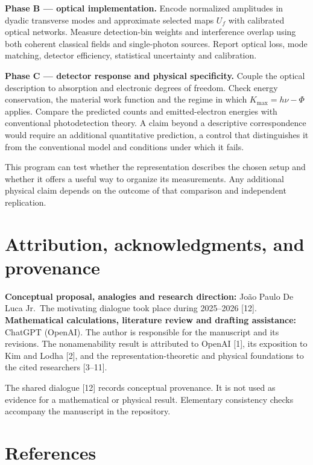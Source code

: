 \documentclass[11pt,a4paper]{article}
\begin{document}
\textbf{Phase B --- optical implementation.} Encode normalized amplitudes in dyadic transverse modes and approximate selected maps \(U_f\) with calibrated optical networks. Measure detection-bin weights and interference overlap using both coherent classical fields and single-photon sources. Report optical loss, mode matching, detector efficiency, statistical uncertainty and calibration.

\textbf{Phase C --- detector response and physical specificity.} Couple the optical description to absorption and electronic degrees of freedom. Check energy conservation, the material work function and the regime in which \(K_{\max}=h\nu-\Phi\) applies. Compare the predicted counts and emitted-electron energies with conventional photodetection theory. A claim beyond a descriptive correspondence would require an additional quantitative prediction, a control that distinguishes it from the conventional model and conditions under which it fails.

This program can test whether the representation describes the chosen setup and whether it offers a useful way to organize its measurements. Any additional physical claim depends on the outcome of that comparison and independent replication.

\hypertarget{attribution-acknowledgments-and-provenance}{%
\section*{Attribution, acknowledgments, and provenance}\label{attribution-acknowledgments-and-provenance}}

\textbf{Conceptual proposal, analogies and research direction:} João Paulo De Luca Jr.~The motivating dialogue took place during 2025--2026 {[}12{]}. \textbf{Mathematical calculations, literature review and drafting assistance:} ChatGPT (OpenAI). The author is responsible for the manuscript and its revisions. The nonamenability result is attributed to OpenAI {[}1{]}, its exposition to Kim and Lodha {[}2{]}, and the representation-theoretic and physical foundations to the cited researchers {[}3--11{]}.

The shared dialogue {[}12{]} records conceptual provenance. It is not used as evidence for a mathematical or physical result. Elementary consistency checks accompany the manuscript in the repository.

\hypertarget{references}{%
\section*{References}\small\setlength{\parindent}{0pt}\setlength{\parskip}{4pt}\label{references}}
\end{document}
